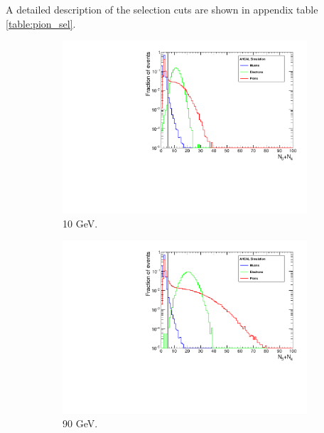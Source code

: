 A detailed description of the selection cuts are shown in appendix table \ref{table:pion_sel}.

\begin{figure}[htbp!]
	\begin{subfigure}[t]{0.5\textwidth}
		\centering
		\includegraphics[width=1\linewidth]{../Thesis_Plots/Timing/Pions/Plots/SelectionCut_N3N4_10GeV}
		\caption{10 GeV.} \label{fig:pi10GeV_N3N4}
	\end{subfigure}
	\hfill
	\begin{subfigure}[t]{0.5\textwidth}
		\centering
		\includegraphics[width=1\linewidth]{../Thesis_Plots/Timing/Pions/Plots/SelectionCut_N3N4_90GeV}
		\caption{90 GeV.} \label{fig:pi90GeV_N3N4}
	\end{subfigure}
	\hfill
	\begin{subfigure}[t]{0.5\textwidth}

\end{subfigure}
\end{figure}
